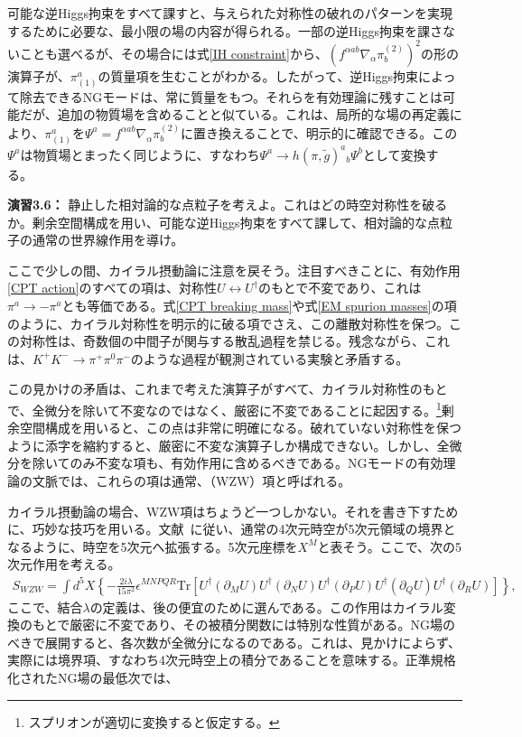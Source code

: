 可能な逆Higgs拘束をすべて課すと、与えられた対称性の破れのパターンを実現するために必要な、最小限の場の内容が得られる。一部の逆Higgs拘束を課さないことも選べるが、その場合には式\eqref{IH constraint}から、$(f^{\alpha a b} \nabla_\alpha \pi_b^{(2)})^2$の形の演算子が、$\pi^a_{(1)}$の質量項を生むことがわかる。したがって、逆Higgs拘束によって除去できるNGモードは、常に質量をもつ。それらを有効理論に残すことは可能だが、追加の物質場を含めることと似ている。これは、局所的な場の再定義により、$\pi^a_{(1)}$を$\Psi^a = f^{\alpha a b} \nabla_\alpha \pi_b^{(2)}$に置き換えることで、明示的に確認できる。この$\Psi^a$は物質場とまったく同じように、すなわち$\Psi^a \to h(\pi, \tilde g)^a{}_b \Psi^b$として変換する。
%
\begin{eBox}
%
{\bf 演習3.6：} 静止した相対論的な点粒子を考えよ。これはどの時空対称性を破るか。剰余空間構成を用い、可能な逆Higgs拘束をすべて課して、相対論的な点粒子の通常の世界線作用を導け。
%
\end{eBox}
%





ここで少しの間、カイラル摂動論に注意を戻そう。注目すべきことに、有効作用\eqref{CPT action}のすべての項は、対称性$U \leftrightarrow U^\dag$のもとで不変であり、これは$\pi^a \to - \pi^a$とも等価である。式\eqref{CPT breaking mass}や式\eqref{EM spurion masses}の項のように、カイラル対称性を明示的に破る項でさえ、この離散対称性を保つ。この対称性は、奇数個の中間子が関与する散乱過程を禁じる。残念ながら、これは、$K^+ K^- \to \pi^+ \pi^0 \pi^-$のような過程が観測されている実験と矛盾する。

この見かけの矛盾は、これまで考えた演算子がすべて、カイラル対称性のもとで、全微分を除いて不変なのではなく、厳密に不変であることに起因する。\footnote{スプリオンが適切に変換すると仮定する。}剰余空間構成を用いると、この点は非常に明確になる。破れていない対称性を保つように添字を縮約すると、厳密に不変な演算子しか構成できない。しかし、全微分を除いてのみ不変な項も、有効作用に含めるべきである。NGモードの有効理論の文脈では、これらの項は通常、（WZW）項と呼ばれる。

カイラル摂動論の場合、WZW項はちょうど一つしかない。それを書き下すために、巧妙な技巧を用いる。文献~\cite{Witten:1983tw}に従い、通常の4次元時空が5次元領域の境界となるように、時空を5次元へ拡張する。5次元座標を$X^M$と表そう。ここで、次の5次元作用を考える。
%
\begin{align}\label{WZW pi 5D}
\!\!\!	S_{WZW} =\! \int \! d^5 X \!\left\{ - \frac{2i \lambda}{15 \pi^2}\epsilon^{MNPQR} \mbox{Tr} \left[ U^\dag (\partial_M U)  U^\dag (\partial_N U) U^\dag (\partial_P U) U^\dag (\partial_Q U) U^\dag (\partial_R U) \right] \right\} ,
\end{align}
%
ここで、結合$\lambda$の定義は、後の便宜のために選んである。この作用はカイラル変換のもとで厳密に不変であり、その被積分関数には特別な性質がある。NG場のべきで展開すると、各次数が全微分になるのである。これは、見かけによらず、実際には境界項、すなわち4次元時空上の積分であることを意味する。正準規格化されたNG場の最低次では、

